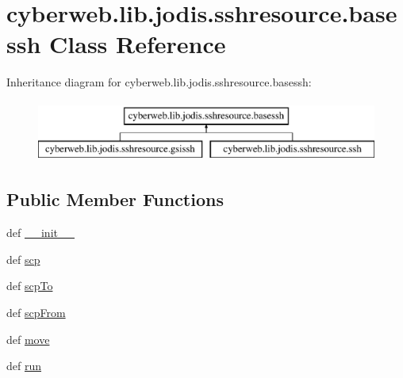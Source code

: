 \hypertarget{classcyberweb_1_1lib_1_1jodis_1_1sshresource_1_1basessh}{\section{cyberweb.\-lib.\-jodis.\-sshresource.\-basessh \-Class \-Reference}
\label{classcyberweb_1_1lib_1_1jodis_1_1sshresource_1_1basessh}
}
\-Inheritance diagram for cyberweb.\-lib.\-jodis.\-sshresource.\-basessh\-:\begin{figure}[H]
\begin{center}
\leavevmode
\includegraphics[height=2.000000cm]{classcyberweb_1_1lib_1_1jodis_1_1sshresource_1_1basessh}
\end{center}
\end{figure}
\subsection*{\-Public \-Member \-Functions}
\begin{DoxyCompactItemize}
\item 
def \hyperlink{classcyberweb_1_1lib_1_1jodis_1_1sshresource_1_1basessh_aafa9747bdf98f73ea3553a1ba52c6370}{\-\_\-\-\_\-init\-\_\-\-\_\-}
\item 
def \hyperlink{classcyberweb_1_1lib_1_1jodis_1_1sshresource_1_1basessh_a0b3e32a38c84aa6f3e51bbd0e4c707e1}{scp}
\item 
def \hyperlink{classcyberweb_1_1lib_1_1jodis_1_1sshresource_1_1basessh_a8c90434f6169e17ba1a2bbcb2727e59b}{scp\-To}
\item 
def \hyperlink{classcyberweb_1_1lib_1_1jodis_1_1sshresource_1_1basessh_ae9a54d52f4a0b6f59739865eac784ae8}{scp\-From}
\item 
def \hyperlink{classcyberweb_1_1lib_1_1jodis_1_1sshresource_1_1basessh_a106fa5f8df30b4dc7e4d5d94adea0007}{move}
\item 
def \hyperlink{classcyberweb_1_1lib_1_1jodis_1_1sshresource_1_1basessh_af91589fad4ef3f33ca8b7cf34cdb28dd}{run}
\end{DoxyCompactItemize}
